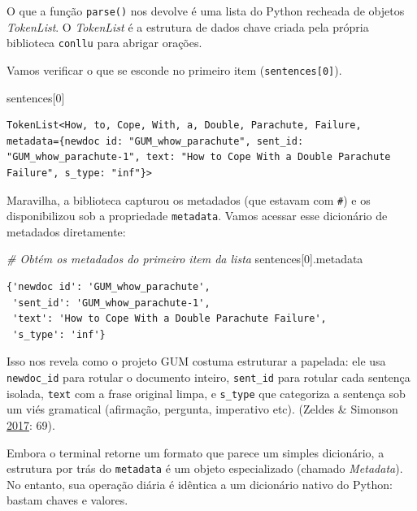 \documentclass[
  brazilian,
]{article}
\newenvironment{Shaded}{}{}
\newcommand{\CommentTok}[1]{\textcolor[rgb]{0.38,0.63,0.69}{\textit{#1}}}
\newcommand{\DecValTok}[1]{\textcolor[rgb]{0.25,0.63,0.44}{#1}}
\newcommand{\NormalTok}[1]{#1}
\begin{document}
O que a função \texttt{parse()} nos devolve é uma lista do Python
recheada de objetos \emph{TokenList}. O \emph{TokenList} é a estrutura
de dados chave criada pela própria biblioteca \texttt{conllu} para
abrigar orações.

Vamos verificar o que se esconde no primeiro item
(\texttt{sentences{[}0{]}}).

\begin{Shaded}
\begin{Highlighting}[]
\NormalTok{sentences[}\DecValTok{0}\NormalTok{]}
\end{Highlighting}
\end{Shaded}

\begin{verbatim}
TokenList<How, to, Cope, With, a, Double, Parachute, Failure, metadata={newdoc id: "GUM_whow_parachute", sent_id: "GUM_whow_parachute-1", text: "How to Cope With a Double Parachute Failure", s_type: "inf"}>
\end{verbatim}

Maravilha, a biblioteca capturou os metadados (que estavam com
\texttt{\#}) e os disponibilizou sob a propriedade \texttt{metadata}.
Vamos acessar esse dicionário de metadados diretamente:

\begin{Shaded}
\begin{Highlighting}[]
\CommentTok{\# Obtém os metadados do primeiro item da lista}
\NormalTok{sentences[}\DecValTok{0}\NormalTok{].metadata}
\end{Highlighting}
\end{Shaded}

\begin{verbatim}
{'newdoc id': 'GUM_whow_parachute',
 'sent_id': 'GUM_whow_parachute-1',
 'text': 'How to Cope With a Double Parachute Failure',
 's_type': 'inf'}
\end{verbatim}

Isso nos revela como o projeto GUM costuma estruturar a papelada: ele
usa \texttt{newdoc\_id} para rotular o documento inteiro,
\texttt{sent\_id} para rotular cada sentença isolada, \texttt{text} com
a frase original limpa, e \texttt{s\_type} que categoriza a sentença sob
um viés gramatical (afirmação, pergunta, imperativo etc). (Zeldes \&
Simonson \href{https://www.aclweb.org/anthology/W16-1709}{2017}: 69).

Embora o terminal retorne um formato que parece um simples dicionário, a
estrutura por trás do \texttt{metadata} é um objeto especializado
(chamado \emph{Metadata}). No entanto, sua operação diária é idêntica a
um dicionário nativo do Python: bastam chaves e valores.
\end{document}
